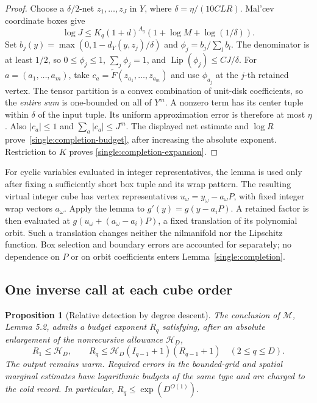 \documentclass[11pt,a4paper]{article}
\newtheorem{proposition}[theorem]{Proposition}
\theoremstyle{definition}
\newcommand{\M}{\mathcal M}
\newcommand{\Lip}{\operatorname{Lip}}
\begin{document}
\begin{proof}
Choose a \(\delta/2\)-net \(z_1,\ldots,z_J\) in \(Y\), where
\(\delta=\eta/(10CLR)\).  Mal'cev coordinate boxes give
\[
 \log J\le K_q(1+d)^{A_q}
             (1+\log M+\log(1/\delta)).
\]
Set \(b_j(y)=\max(0,1-d_Y(y,z_j)/\delta)\) and
\(\phi_j=b_j/\sum_l b_l\).  The denominator is at least \(1/2\),
so \(0\le\phi_j\le1\), \(\sum_j\phi_j=1\), and
\(\Lip(\phi_j)\le CJ/\delta\).
For \(a=(a_1,\ldots,a_m)\), take
\(c_a=\widetilde F(z_{a_1},\ldots,z_{a_m})\) and use
\(\phi_{a_j}\) at the \(j\)-th retained vertex.  The tensor
partition is a convex combination of unit-disk coefficients, so the
\emph{entire sum} is one-bounded on all of \(Y^m\).  A nonzero
term has its center tuple within
\(\delta\) of the input tuple.  Its uniform approximation error is
therefore at most \(\eta\).  Also \(|c_a|\le1\) and
\(\sum_a|c_a|\le J^m\).  The displayed net estimate and
\(\log R\) prove~\eqref{single:completion-budget}, after increasing
the absolute exponent.  Restriction to \(K\) proves
\eqref{single:completion-expansion}.
\end{proof}

For cyclic variables evaluated in integer representatives, the lemma is
used only after fixing a sufficiently short box tuple and its wrap
pattern.  The resulting virtual integer cube has vertex representatives
\(u_\omega=y_\omega-a_\omega P\), with fixed integer wrap vectors
\(a_\omega\).  Apply the lemma to \(g'(y)=g(y-a_iP)\).
A retained factor is then evaluated at
\(g(u_\omega+(a_\omega-a_i)P)\), a fixed translation of its
polynomial orbit.  Such a translation changes neither the nilmanifold
nor the Lipschitz function.  Box selection and boundary errors are
accounted for separately; no dependence on \(P\) or on orbit
coefficients enters Lemma~\ref{single:completion}.

\subsection{One inverse call at each cube order}

\begin{proposition}[Relative detection by degree descent]\label{single:relative}
The conclusion of \(\M\), Lemma 5.2, admits a budget exponent
\(R_q\) satisfying, after an absolute enlargement of the
nonrecursive allowance \(\mathcal H_D\),
\begin{equation}\label{single:relative-rec}
 R_1\le \mathcal H_D,\qquad
 R_q\le \mathcal H_D(I_{q-1}+1)(R_{q-1}+1)\quad(2\le q\le D).
\end{equation}
The output remains warm. Required errors in the bounded-grid and
spatial marginal estimates have logarithmic budgets of the same
type and are charged to the cold record. In particular,
\(R_q\le\exp(D^{O(1)})\).
\end{proposition}
\end{document}
